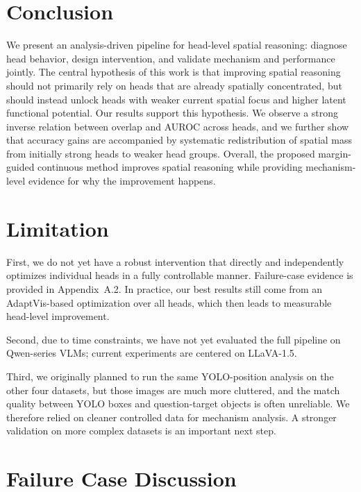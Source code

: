 \documentclass{article}
\begin{document}
\section{Conclusion}
We present an analysis-driven pipeline for head-level spatial reasoning:
diagnose head behavior, design intervention, and validate mechanism and
performance jointly. The central hypothesis of this work is that
improving spatial reasoning should not primarily rely on heads that are
already spatially concentrated, but should instead unlock heads with
weaker current spatial focus and higher latent functional potential. Our
results support this hypothesis. We observe a strong inverse relation
between overlap and AUROC across heads, and we further show that
accuracy gains are accompanied by systematic redistribution of spatial
mass from initially strong heads to weaker head groups. Overall, the
proposed margin-guided continuous method improves spatial reasoning while
providing mechanism-level evidence for why the improvement happens.

\section{Limitation}
First, we do not yet have a robust intervention that directly and
independently optimizes individual heads in a fully controllable manner.
Failure-case evidence is provided in Appendix~A.2. In practice, our best
results still come from an AdaptVis-based optimization over all heads,
which then leads to measurable head-level improvement.

Second, due to time constraints, we have not yet evaluated the full
pipeline on Qwen-series VLMs; current experiments are centered on
LLaVA-1.5.

Third, we originally planned to run the same YOLO-position analysis on
the other four datasets, but those images are much more cluttered, and
the match quality between YOLO boxes and question-target objects is
often unreliable. We therefore relied on cleaner controlled data for
mechanism analysis. A stronger validation on more complex datasets is an
important next step.




\appendix
\section{Failure Case Discussion}
\end{document}

